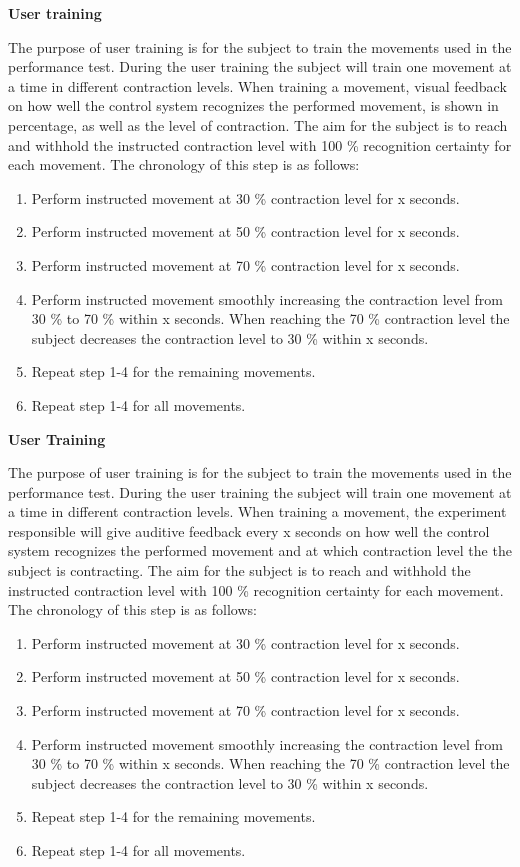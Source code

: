 \textbf{User training} %

The purpose of user training is for the subject to train the movements used in the performance test. During the user training the subject will train one movement at a time in different contraction levels. When training a movement, visual feedback on how well the control system recognizes the performed movement, is shown in percentage, as well as the level of contraction. The aim for the subject is to reach and withhold the instructed contraction level with 100 \% recognition certainty for each movement. The chronology of this step is as follows:

\begin{enumerate}
	\item Perform instructed movement at 30 \% contraction level for x seconds.
	\item Perform instructed movement at 50 \% contraction level for x seconds.
	\item Perform instructed movement at 70 \% contraction level for x seconds.
	\item Perform instructed movement smoothly increasing the contraction level from 30 \% to 70 \% within x seconds. When reaching the 70 \% contraction level the subject decreases the contraction level to 30 \% within x seconds.
	\item Repeat step 1-4 for the remaining movements.
	\item Repeat step 1-4 for all movements.
\end{enumerate} 

\textbf{User Training} %

The purpose of user training is for the subject to train the movements used in the performance test. During the user training the subject will train one movement at a time in different contraction levels. When training a movement, the experiment responsible will give auditive feedback every x seconds on how well the control system recognizes the performed movement and at which contraction level the the subject is contracting. The aim for the subject is to reach and withhold the instructed contraction level with 100 \% recognition certainty for each movement. The chronology of this step is as follows:

\begin{enumerate}
	\item Perform instructed movement at 30 \% contraction level for x seconds.
	\item Perform instructed movement at 50 \% contraction level for x seconds.
	\item Perform instructed movement at 70 \% contraction level for x seconds.
	\item Perform instructed movement smoothly increasing the contraction level from 30 \% to 70 \% within x seconds. When reaching the 70 \% contraction level the subject decreases the contraction level to 30 \% within x seconds.
	\item Repeat step 1-4 for the remaining movements.
	\item Repeat step 1-4 for all movements.
\end{enumerate} 

